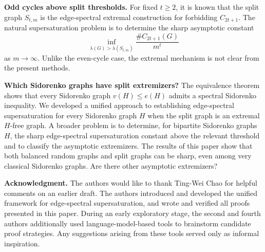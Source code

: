 \documentclass[11pt]{article}
\theoremstyle{definition}
\theoremstyle{plain}
\begin{document}
\smallskip
\noindent\textbf{Odd cycles above split thresholds.}
For fixed \(t\ge2\), it is known that the split graph \(S_{t,m}\) is the
edge-spectral extremal construction for forbidding \(C_{2t+1}\).  The
natural supersaturation problem is to determine the sharp asymptotic
constant
\[
        \inf_{\lambda(G)>\lambda(S_{t,m})}
        \frac{\texttt{\#}C_{2t+1}(G)}{m^t}
\]
as \(m\to\infty\).  Unlike the even-cycle case, the extremal mechanism is
not clear from the present methods.

\smallskip
\noindent\textbf{Which Sidorenko graphs have split extremizers?}
The equivalence theorem shows that every Sidorenko graph \(v(H)\le e(H)\) admits a
spectral Sidorenko inequality. 
We developed a unified approach to establishing edge-spectral supersaturation for every Sidorenko graph $H$ when the split graph is an extremal $H$-free graph. 
A broader problem is to determine, for
bipartite Sidorenko graphs \(H\), the sharp edge-spectral supersaturation
constant above the relevant threshold and to classify the
asymptotic extremizers. The results of this paper show that both
balanced random graphs and split graphs can be sharp, even among very
classical Sidorenko graphs. Are there other asymptotic extremizers?



{ 
\smallskip
\noindent\textbf{Acknowledgment.} 
The authors would like to thank Ting-Wei Chao for helpful comments 
on an earlier draft.   
The authors introduced and developed the unified framework for edge-spectral supersaturation, and wrote and verified all proofs presented in this paper. During an early exploratory stage, the second and fourth authors additionally used language-model-based tools to brainstorm candidate proof strategies. Any suggestions arising from these tools served only as informal inspiration. 
}

\frenchspacing

%
%


\end{document}
